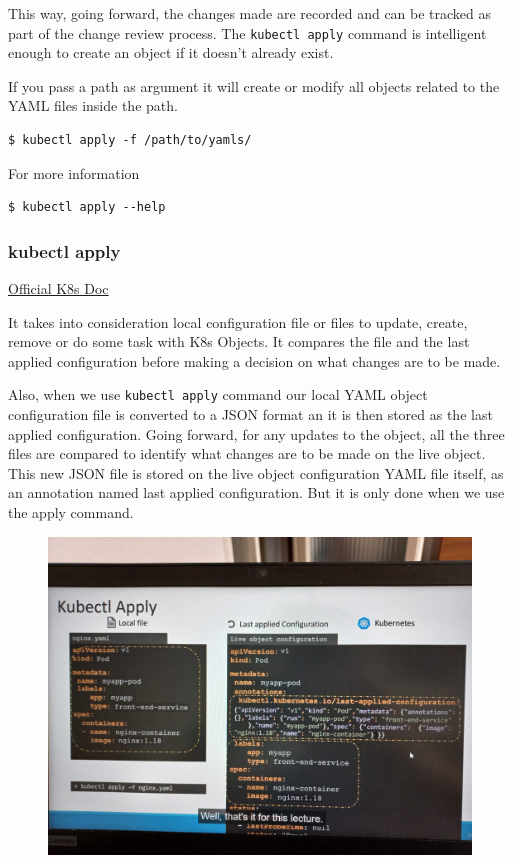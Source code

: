\documentclass{article}
\newenvironment{codetemplate}[1][]{%
  \mybasecolorbox[#1]
  \itshape
}{%
  \endmybasecolorbox
}
\begin{document}
This way, going forward, the changes made are recorded and can be tracked as part of the change review process. The \verb|kubectl apply| command is intelligent enough to create an object if it doesn't already exist.

If you pass a path as argument it will create or modify all objects related to the YAML files inside the path.

\begin{codetemplate}{}
\begin{verbatim}
$ kubectl apply -f /path/to/yamls/
\end{verbatim}
\end{codetemplate}

For more information
\begin{codetemplate}{}
\begin{verbatim}
$ kubectl apply --help
\end{verbatim}
\end{codetemplate}

\subsubsection{kubectl apply}

\href{https://jamesdefabia.github.io/docs/user-guide/kubectl/kubectl_apply/}{Official K8s Doc}

It takes into consideration local configuration file or files to update, create, remove or do some task with K8s Objects. It compares the file and the last applied configuration before making a decision on what changes are to be made.

Also, when we use \verb|kubectl apply| command our local YAML object configuration file is converted to a JSON format an it is then stored as the last applied configuration. Going forward, for any updates to the object, all the three files are compared to identify what changes are to be made on the live object. This new JSON file is stored on the live object configuration YAML file itself, as an annotation named last applied configuration. But it is only done when we use the apply command.

\begin{figure}[H]
    \centering
    \includegraphics[width=\textwidth]{pictures/apply1.jpeg}
\end{figure}
\end{document}
